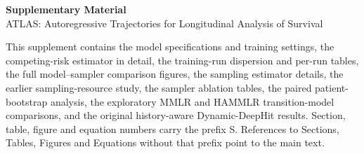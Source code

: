 \ifdefined{}\clearpage\fi
\setcounter{section}{0}
\setcounter{subsection}{0}
\setcounter{table}{0}
\setcounter{figure}{0}
\setcounter{equation}{0}
\renewcommand{\thesection}{S\arabic{section}}
\renewcommand{\thetable}{S\arabic{table}}
\renewcommand{\thefigure}{S\arabic{figure}}
\renewcommand{\theequation}{S\arabic{equation}}
\ifdefined{}
\begin{center}
{\Large\bfseries Supplementary Material}\\[4pt]
{\large ATLAS: Autoregressive Trajectories for Longitudinal Analysis of Survival}
\end{center}
\fi
\noindent This supplement contains the model specifications and training settings, the competing-risk estimator in detail, the training-run dispersion and per-run tables, the full model--sampler comparison figures, the sampling estimator details, the earlier sampling-resource study, the sampler ablation tables, the paired patient-bootstrap analysis, the exploratory MMLR and HAMMLR transition-model comparisons, and the original history-aware Dynamic-DeepHit results. Section, table, figure and equation numbers carry the prefix S. References to Sections, Tables, Figures and Equations without that prefix point to the main text.









\clearpage



\clearpage
\setcounter{section}{8}

\setcounter{table}{13}

\clearpage

